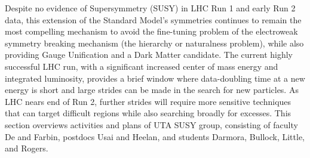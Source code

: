 Despite no evidence of Supersymmetry (SUSY) in LHC Run 1 and early Run
2 data, this extension of the Standard Model's symmetries continues to
remain the most compelling mechanism to avoid the fine-tuning problem
of the electroweak symmetry breaking mechanism (the hierarchy or
naturalness problem), while also providing Gauge Unification and a
Dark Matter candidate. The current highly successful LHC run, with a
significant increased center of mass energy and integrated luminosity,
provides a brief window where data-doubling time at a new energy is
short and large strides can be made in the search for new
particles. As LHC nears end of Run 2, further strides will require
more sensitive techniques that can target difficult regions while also
searching broadly for excesses. This section overviews activities and
plans of UTA SUSY group, consisting of faculty De and Farbin, postdocs
Usai and Heelan, and students Darmora, Bullock, Little, and Rogers.


